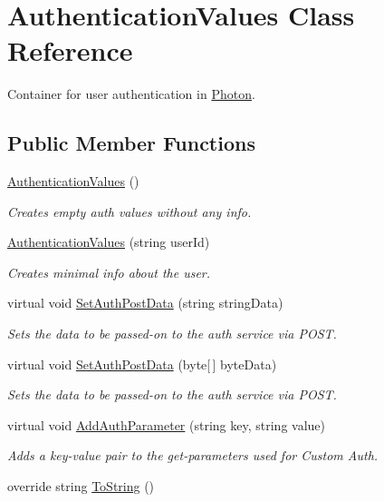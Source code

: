 \hypertarget{class_authentication_values}{}\section{Authentication\+Values Class Reference}
\label{class_authentication_values}


Container for user authentication in \hyperlink{namespace_photon}{Photon}.  


\subsection*{Public Member Functions}
\begin{DoxyCompactItemize}
\item 
\hyperlink{class_authentication_values_a25eb4617207f2cb2f97ecbf91091ed96}{Authentication\+Values} ()
\begin{DoxyCompactList}\small\item\em Creates empty auth values without any info.\end{DoxyCompactList}\item 
\hyperlink{class_authentication_values_a59e9550389ab702b9bc033eeb6e117a2}{Authentication\+Values} (string user\+Id)
\begin{DoxyCompactList}\small\item\em Creates minimal info about the user. \end{DoxyCompactList}\item 
virtual void \hyperlink{class_authentication_values_adac06329a99f2a0035e485e45460d9af}{Set\+Auth\+Post\+Data} (string string\+Data)
\begin{DoxyCompactList}\small\item\em Sets the data to be passed-\/on to the auth service via P\+O\+ST. \end{DoxyCompactList}\item 
virtual void \hyperlink{class_authentication_values_a3fd84b1b6fca86c6838d6c2fff8926e0}{Set\+Auth\+Post\+Data} (byte\mbox{[}$\,$\mbox{]} byte\+Data)
\begin{DoxyCompactList}\small\item\em Sets the data to be passed-\/on to the auth service via P\+O\+ST. \end{DoxyCompactList}\item 
virtual void \hyperlink{class_authentication_values_af800bbd7144b184c244277c37297dba1}{Add\+Auth\+Parameter} (string key, string value)
\begin{DoxyCompactList}\small\item\em Adds a key-\/value pair to the get-\/parameters used for Custom Auth. \end{DoxyCompactList}\item 
override string \hyperlink{class_authentication_values_af74e9d15a79034c547ea621bb70899b4}{To\+String} ()
\end{DoxyCompactItemize}
